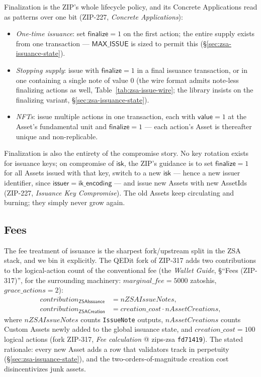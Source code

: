 \documentclass[11pt,a4paper]{article}
\theoremstyle{definition}
\begin{document}
Finalization is the ZIP's whole lifecycle policy, and its Concrete
Applications read as patterns over one bit (ZIP-227, \emph{Concrete
Applications}):
\begin{itemize}
\item \emph{One-time issuance}: set $\mathsf{finalize} = 1$ on the first
  action; the entire supply exists from one transaction ---
  $\mathsf{MAX\_ISSUE}$ is sized to permit this
  (\S\ref{sec:zsa-issuance-state}).
\item \emph{Stopping supply}: issue with $\mathsf{finalize} = 1$ in a
  final issuance transaction, or in one containing a single note of
  value $0$ (the wire format admits note-less finalizing actions as
  well, Table~\ref{tab:zsa-issue-wire}; the library insists on the
  finalizing variant, \S\ref{sec:zsa-issuance-state}).
\item \emph{NFTs}: issue multiple actions in one transaction, each with
  $\mathsf{value} = 1$ at the Asset's fundamental unit and
  $\mathsf{finalize} = 1$ --- each action's Asset is thereafter unique
  and non-replicable.
\end{itemize}

Finalization is also the entirety of the compromise story. No key
rotation exists for issuance keys; on compromise of $\mathsf{isk}$, the
ZIP's guidance is to set $\mathsf{finalize} = 1$ for all Assets issued
with that key, switch to a new $\mathsf{isk}$ --- hence a new issuer
identifier, since $\mathsf{issuer} = \mathsf{ik\_encoding}$ --- and
issue new Assets with new AssetIds (ZIP-227, \emph{Issuance Key
Compromise}). The old Assets keep circulating and burning; they simply
never grow again.

\subsection{Fees}\label{sec:zsa-issuance-fees}

The fee treatment of issuance is the sharpest fork/upstream split in the
ZSA stack, and we bin it explicitly. The QEDit fork of ZIP-317 adds two
contributions to the logical-action count of the conventional fee (the
\emph{Wallet Guide}, \S``Fees (ZIP-317)'', for the surrounding
machinery: $\mathit{marginal\_fee} = 5000$ zatoshis,
$\mathit{grace\_actions} = 2$):
\begin{align*}
\mathit{contribution}_{\mathsf{ZSAIssuance}} &=
  \mathit{nZSAIssueNotes},\\
\mathit{contribution}_{\mathsf{ZSACreation}} &=
  \mathit{creation\_cost} \cdot \mathit{nAssetCreations},
\end{align*}
where $\mathit{nZSAIssueNotes}$ counts \texttt{IssueNote} outputs,
$\mathit{nAssetCreations}$ counts Custom Assets newly added to the
global issuance state, and $\mathit{creation\_cost} = 100$ logical
actions (fork ZIP-317, \emph{Fee calculation} @ zips-zsa
\texttt{fd71419}). The stated rationale: every new Asset adds a row that
validators track in perpetuity
(\S\ref{sec:zsa-issuance-state}), and the two-orders-of-magnitude
creation cost disincentivizes junk assets.
\end{document}

